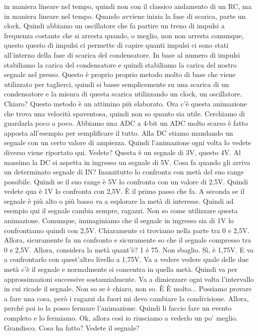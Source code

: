 {in maniera lineare nel tempo, quindi non con il classico andamento di un RC, ma in maniera lineare nel tempo. Quando avviene inizia la fase di scarica, parte un clock. Quindi abbiamo un oscillatore che fa partire un treno di impulsi a frequenza costante che si arresta quando, o meglio, non non arresta comunque, questo questo di impulsi ci permette di capire quanti impulsi ci sono stati all'interno della fase di scarica del condensatore. In base al numero di impulsi stabiliamo la carica del condensatore e quindi stabiliamo la carica del nostro segnale nel presso. Questo è proprio proprio metodo molto di base che viene utilizzato per taglierci, quindi si basse semplicemente su una scarica di un condensatore e la misura di questa scarica utilizzando un clock, un oscillatore. Chiaro? Questo metodo è un attimino più elaborato. Ora c'è questa animazione che trova una velocità spaventosa, quindi non so quanto sia utile. Cerchiamo di guardarla poco a poco. Abbiamo una ADC a 4-bit un ADC molto scarso è fatto apposta all'esempio per semplificare il tutto. Alla DC stiamo mandando un segnale con un certo valore di ampiezza. Quindi l'animazione ogni volta lo vedete diverso viene riportato qui. Vedete? Questa è un segnale di 3V, questo 4V. Al massimo la DC si aspetta in ingresso un segnale di 5V. Cosa fa quando gli arriva un determinato segnale di IN? Inanzitutto lo confronta con metà del suo range possibile. Quindi se il suo range è 5V lo confronta con un valore di 2,5V. Quindi vedete qua è 1V lo confronta con 2,5V. È il primo passo che fa. A seconda se il segnale è più alto o più basso va a esplorare la metà di interesse. Quindi ad esempio qui il segnale cambia sempre, ragazzi. Non so come utilizzare questa animazione. Comunque, immaginiamo che il segnale in ingresso sia di 1V lo confrontiamo quindi con 2,5V. Chiaramente ci troviamo nella parte tra 0 e 2,5V. Allora, sicuramente fa un confronto e sicuramente so che il segnale compresso tra 0 e 2,5V. Allora, considera la metà quant'è? 1 è 75. Non sbaglio. Sì, è 1,75V. E va a confrontarlo con quest'altro livello a 1,75V. Va a vedere vedere quale delle due metà c'è il segnale e normalmente si concentra in quella metà. Quindi va per approssimazioni successive sostanzialmente. Va a dimiezzare ogni volta l'intervallo in cui ricade il segnale. Non so se è chiaro, non so. È È molto... Possiamo provare a fare una cosa, però i ragazzi da fuori mi devo cambiare la condivisione. Allora, perché poi io la posso fermare l'animazione. Quindi li faccio fare un evento completo e lo fermiamo. Ok, allora così io riusciamo a vederlo un po' meglio. Grandisco. Cosa ha fatto? Vedete il segnale? 

}
